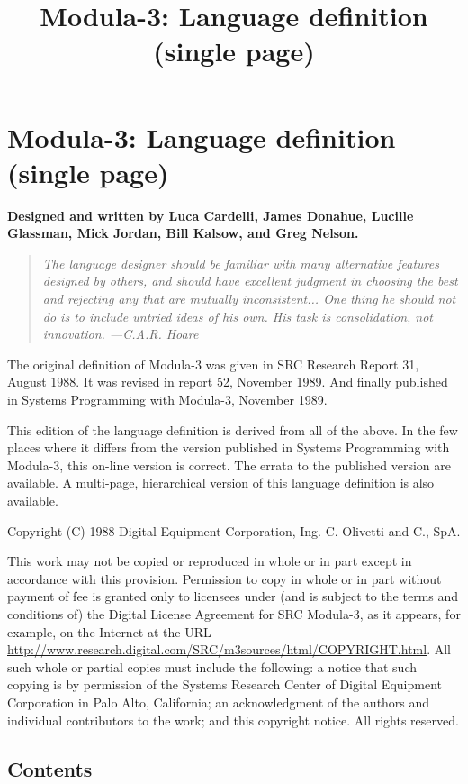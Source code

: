 \documentclass[10pt]{article}
\title{Modula-3: Language definition (single page)}
\begin{document}
\section*{Modula-3: Language definition (single page)}

\textbf{Designed and written by Luca Cardelli, James Donahue, Lucille
  Glassman, Mick Jordan, Bill Kalsow, and Greg Nelson.}

\begin{quote}
  \emph{ The language designer should be familiar with many alternative
    features designed by others, and should have excellent judgment in
    choosing the best and rejecting any that are mutually inconsistent... One
    thing he should not do is to include untried ideas of his own. His task is
    consolidation, not innovation. ---C.A.R. Hoare }
\end{quote}

The original definition of Modula-3 was given in SRC Research Report 31,
August 1988. It was revised in report 52, November 1989.  And finally published
in Systems Programming with Modula-3, November 1989.

This edition of the language definition is derived from all of the above. In
the few places where it differs from the version published in Systems
Programming with Modula-3, this on-line version is correct. The errata to the
published version are available. A multi-page, hierarchical version of this
language definition is also available.

Copyright (C) 1988 Digital Equipment Corporation, Ing. C. Olivetti and C.,
SpA.

This work may not be copied or reproduced in whole or in part except in
accordance with this provision. Permission to copy in whole or in part without
payment of fee is granted only to licensees under (and is subject to the terms
and conditions of) the Digital License Agreement for SRC Modula-3, as it
appears, for example, on the Internet at the URL
\url{http://www.research.digital.com/SRC/m3sources/html/COPYRIGHT.html}. All
such whole or partial copies must include the following: a notice that such
copying is by permission of the Systems Research Center of Digital Equipment
Corporation in Palo Alto, California; an acknowledgment of the authors and
individual contributors to the work; and this copyright notice. All rights
reserved.

\subsection*{Contents}
\end{document}
